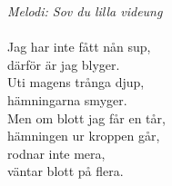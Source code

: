 {\footnotesize\textit{Melodi: Sov du lilla videung}}\\
\\
Jag har inte fått nån sup,\\
därför är jag blyger.\\
Uti magens trånga djup,\\
hämningarna smyger.\\
Men om blott jag får en tår,\\
hämningen ur kroppen går,\\
rodnar inte mera,\\
väntar blott på flera.
